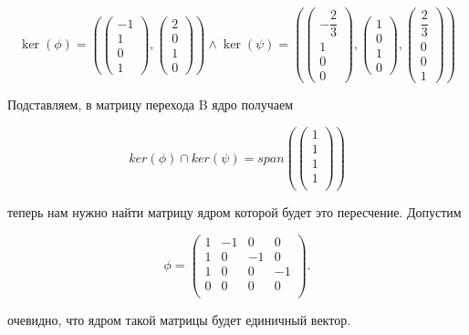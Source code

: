 \documentclass[a4paper,12pt]{article}
\begin{document}
\[
\ker(\phi) = \left( 
    \begin{pmatrix}
        -1 \\ 
        1 \\ 
        0 \\ 
        1
    \end{pmatrix}, 
    \begin{pmatrix}
        2 \\ 
        0 \\ 
        1 \\ 
        0
    \end{pmatrix} 
\right) \land \ker(\psi) = \left( 
    \begin{pmatrix} 
        -\dfrac{2}{3} \\ 
        1 \\ 
        0 \\ 
        0 
    \end{pmatrix}, 
    \begin{pmatrix} 
        1 \\ 
        0 \\ 
        1 \\ 
        0 
    \end{pmatrix}, 
    \begin{pmatrix} 
        \dfrac{2}{3} \\ 
        0 \\ 
        0 \\ 
        1 
    \end{pmatrix} 
\right)
\]

Подставляем, в матрицу перехода B ядро получаем

\[
ker(\phi) \cap ker(\psi) = span(\begin{pmatrix}
    1 \\
    1 \\
    1 \\
    1 \\
\end{pmatrix})
\]

теперь нам нужно найти матрицу ядром которой будет это пересчение. Допустим

\[
\phi =
\begin{pmatrix}
1 & -1 & 0 & 0 \\
1 & 0 & -1 & 0 \\
1 & 0 & 0 & -1 \\
0 & 0 & 0 & 0 \\
\end{pmatrix}.
\]

очевидно, что ядром такой матрицы будет единичный вектор.
\end{document}
